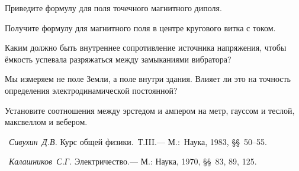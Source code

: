 \begin{lab:questions}
	\item Приведите формулу для поля точечного магнитного диполя.
	
	\item Получите формулу для магнитного поля в центре кругового витка с током.
	
	\item Каким должно быть внутреннее сопротивление источника напряжения, чтобы ёмкость успевала разряжаться между замыканиями
	вибратора?
	
	\item Мы измеряем не поле Земли, а поле внутри здания. Влияет ли это на точность определения электродинамической постоянной?
	
	\item Установите соотношения между эрстедом и ампером на метр, гауссом и теслой, максвеллом и вебером.
\end{lab:questions}

\begin{lab:literature}
	\item~\emph{Сивухин~Д.В.} Курс общей физики.~Т.III.--- М.:~Наука, 1983, \S\S~50--55.
	
	\item~\emph{Калашников~С.Г.} Электричество.--- М.: Наука, 1970, \S\S~83, 89, 125.
\end{lab:literature}
